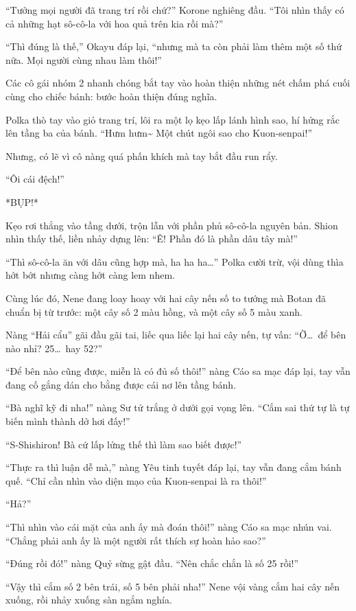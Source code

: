 \documentclass[../main.tex]{subfiles}
\begin{document}
``Tưởng mọi người đã trang trí rồi chứ?'' Korone nghiêng đầu. ``Tôi nhìn thấy có cả những hạt sô-cô-la với hoa quả trên kia rồi mà?''

``Thì đúng là thế,'' Okayu đáp lại, ``nhưng mà ta còn phải làm thêm một số thứ nữa. Mọi người cùng nhau làm thôi!''

Các cô gái nhóm 2 nhanh chóng bắt tay vào hoàn thiện những nét chấm phá cuối cùng cho chiếc bánh: bước hoàn thiện đúng nghĩa.

Polka thò tay vào giỏ trang trí, lôi ra một lọ kẹo lấp lánh hình sao, hí hửng rắc lên tầng ba của bánh. ``Hưm hưm\~{} Một chút ngôi sao cho Kuon-senpai!''

Nhưng, có lẽ vì cô nàng quá phấn khích mà tay bắt đầu run rẩy.

``Ôi cái đệch!''

*BỤP!*

Kẹo rơi thẳng vào tầng dưới, trộn lẫn với phần phủ sô-cô-la nguyên bản. Shion nhìn thấy thế, liền nhảy dựng lên: ``Ê! Phần đó là phần dâu tây mà!''

``Thì sô-cô-la ăn với  dâu cũng hợp mà, ha ha ha\dots'' Polka cười trừ, vội dùng thìa hớt bớt nhưng càng hớt càng lem nhem.

Cùng lúc đó, Nene đang loay hoay với hai cây nến số to tướng mà Botan đã chuẩn bị từ trước: một cây số 2 màu hồng, và một cây số 5 màu xanh.

Nàng ``Hải cẩu'' gãi đầu gãi tai, liếc qua liếc lại hai cây nến, tự vấn: ``Ờ\dots\ để bên nào nhỉ? 25\dots\ hay 52?''

``Để bên nào cũng được, miễn là có đủ số thôi!'' nàng Cáo sa mạc đáp lại, tay vẫn đang cố gắng dán cho bằng được cái nơ lên tầng bánh.

``Bà nghĩ kỹ đi nha!'' nàng Sư tử trắng ở dưới gọi vọng lên. ``Cắm sai thứ tự là tự biến mình thành dở hơi đấy!''

``S-Shishiron! Bà cứ lấp lửng thế thì làm sao biết được!''

``Thực ra thì luận dễ mà,'' nàng Yêu tinh tuyết đáp lại, tay vẫn đang cắm bánh quế. ``Chỉ cần nhìn vào diện mạo của Kuon-senpai là ra thôi!''

``Hả?''

``Thì nhìn vào cái mặt của anh ấy mà đoán thôi!'' nàng Cáo sa mạc nhún vai. ``Chẳng phải anh ấy là một người rất thích sự hoàn hảo sao?''

``Đúng rồi đó!'' nàng Quỷ sừng gật đầu. ``Nên chắc chắn là số 25 rồi!''

``Vậy thì cắm số 2 bên trái, số 5 bên phải nha!'' Nene vội vàng cắm hai cây nến xuống, rồi nhảy xuống sàn ngắm nghía.
\end{document}
